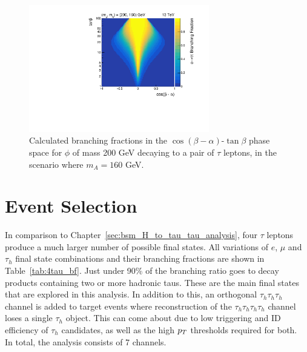 \begin{figure}[!hbtp]
\centering
    \includegraphics[width=0.7\textwidth]{Figures/phi_branching_fractions_mphi200_mA160.pdf}
\caption{Calculated branching fractions in the $\cos(\beta-\alpha)$-$\tan\beta$ phase space for $\phi$ of mass 200 GeV decaying to a pair of $\tau$ leptons, in the scenario where $m_A = 160$ GeV.}
\label{fig:4tau_br_2d}
\end{figure}

\section{Event Selection}

In comparison to Chapter~\ref{sec:bsm_H_to_tau_tau_analysis}, four $\tau$ leptons produce a much larger number of possible final states. 
All variations of $e$, $\mu$ and $\tau_h$ final state combinations and their branching fractions are shown in Table~\ref{tab:4tau_bf}.
Just under 90\% of the branching ratio goes to decay products containing two or more hadronic taus.
These are the main final states that are explored in this analysis. 
In addition to this, an orthogonal $\tau_h \tau_h \tau_h$ channel is added to target events where reconstruction of the $\tau_h \tau_h \tau_h \tau_h$ channel loses a single $\tau_h$ object.
This can come about due to low triggering and ID efficiency of $\tau_h$ candidates, as well as the high $p_{T}$ thresholds required for both. \\
In total, the analysis consists of 7 channels.

